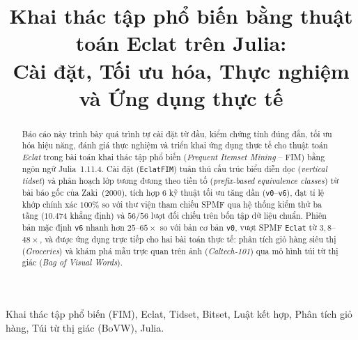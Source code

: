 \documentclass[conference,a4paper]{IEEEtran}
\begin{document}
\title{Khai thác tập phổ biến bằng thuật toán Eclat trên Julia:\\Cài đặt, Tối ưu hóa, Thực nghiệm và Ứng dụng thực tế}

\author{
}

\maketitle

\begin{abstract}
Báo cáo này trình bày quá trình tự cài đặt từ đầu, kiểm chứng tính đúng đắn, tối ưu hóa hiệu năng, đánh giá thực nghiệm và triển khai ứng dụng thực tế cho thuật toán \emph{Eclat} trong bài toán khai thác tập phổ biến (\emph{Frequent Itemset Mining} -- FIM) bằng ngôn ngữ Julia~1.11.4. Cài đặt (\texttt{EclatFIM}) tuân thủ cấu trúc biểu diễn dọc (\emph{vertical tidset}) và phân hoạch lớp tương đương theo tiền tố (\emph{prefix-based equivalence classes}) từ bài báo gốc của Zaki~(2000), tích hợp 6 kỹ thuật tối ưu tăng dần (\texttt{v0}--\texttt{v6}), đạt tỉ lệ khớp chính xác $100\%$ so với thư viện tham chiếu SPMF qua hệ thống kiểm thử ba tầng ($10.474$ khẳng định) và $56/56$ lượt đối chiếu trên bốn tập dữ liệu chuẩn. Phiên bản mặc định \texttt{v6} nhanh hơn $25$--$65\times$ so với bản cơ bản \texttt{v0}, vượt SPMF \texttt{Eclat} từ $3{,}8$--$48\times$, và được ứng dụng trực tiếp cho hai bài toán thực tế: phân tích giỏ hàng siêu thị (\emph{Groceries}) và khám phá mẫu trực quan trên ảnh (\emph{Caltech-101}) qua mô hình túi từ thị giác (\emph{Bag of Visual Words}).
\end{abstract}

\begin{IEEEkeywords}
Khai thác tập phổ biến (FIM), Eclat, Tidset, Bitset, Luật kết hợp, Phân tích giỏ hàng, Túi từ thị giác (BoVW), Julia.
\end{IEEEkeywords}











\clearpage
\appendices

\end{document}

